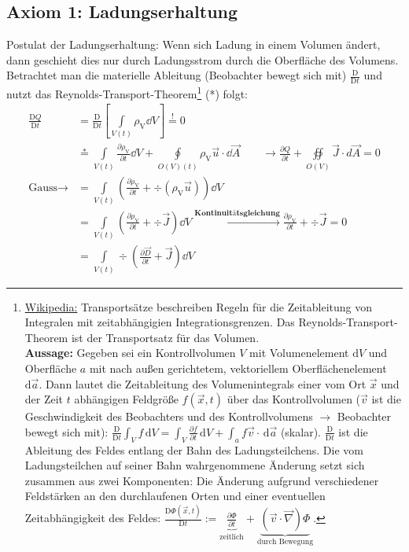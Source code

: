  \subsection{Axiom 1: Ladungserhaltung}\label{ladungserhaltung}
 Postulat der Ladungserhaltung: Wenn sich Ladung in einem Volumen ändert, dann geschieht dies nur durch Ladungsstrom durch die Oberfläche des Volumens.
 Betrachtet man die materielle Ableitung (Beobachter bewegt sich mit) $\frac{\mathrm{D}}{\mathrm{D}t}$ und nutzt das Reynolds-Transport-Theorem\footnote{\href{https://de.wikipedia.org/wiki/Transportsatz}{Wikipedia:} Transportsätze beschreiben Regeln für die Zeitableitung von Integralen mit zeitabhängigien Integrationsgrenzen. Das Reynolds-Transport-Theorem ist der Transportsatz für das Volumen.\\\textbf{Aussage:} Gegeben sei ein Kontrollvolumen $V$ mit Volumenelement $\mathrm{d}V$ und Oberfläche $a$ mit nach außen gerichtetem, vektoriellem Oberflächenelement $\mathrm{d}\vec{a}$. Dann lautet die Zeitableitung des Volumenintegrals einer vom Ort $\vec x$ und der Zeit $t$ abhängigen Feldgröße $f(\vec{x},t)$ über das Kontrollvolumen ($\vec{v}$ ist die Geschwindigkeit des Beobachters und des Kontrollvolumens $\to$ Beobachter bewegt sich mit): $\frac{\mathrm{D}}{\mathrm{D}t}\int_V f\,\mathrm{d}V	=\int_V\frac{\partial f}{\partial t}\,\mathrm{d}V
 	+\int_a f\vec{v}\cdot\,\mathrm{d}\vec{a}
 	$ (skalar). $\frac{\mathrm{D}}{\mathrm{D}t}$ ist die Ableitung des Feldes entlang der Bahn des Ladungsteilchens. Die vom Ladungsteilchen auf seiner Bahn wahrgenommene Änderung setzt sich zusammen aus zwei Komponenten: Die Änderung aufgrund verschiedener Feldstärken an den durchlaufenen Orten und einer eventuellen Zeitabhängigkeit des Feldes: $\frac{\text{D}\Phi(\vec{x},t)}{\text{D}t}:=\underbrace{\frac{\partial\Phi}{\partial t}}_\text{zeitlich}+\underbrace{(\vec{v}\cdot\vec{\nabla})\Phi}_\text{durch Bewegung}$.} (*) folgt:
	        \begin{equation}
		        \begin{split}
			        \frac{\mathrm{D} Q}{\mathrm{D} t}&= \frac{\mathrm{D}}{\mathrm{D} t}\left
			        [ \int\limits_{V(t)}\rho_{\text{V}}\dd V \right] \stackrel{!}{=}0\\&\stackrel{*}{=}
			        \int\limits_{V(t)}\frac{\partial \rho_{\text{V}}}{\partial t}\dd V + \oint
			        \limits_{O(V)(t)}\rho_{\text{V}}\vec{u}\cdot \dd\vec{A}\qquad \to \frac{\partial
				        Q}{\partial t}+ \oiint\limits_{O(V)}\vec{J}\cdot d\vec{A}= 0\\\text{Gauss}\to &\stackrel{}{=}
			        \int\limits_{V(t)}\left(\frac{\partial \rho_{\text{V}}}{\partial t}+ \div
			        \left(\rho_{\text{V}}\vec{u}\right) \right) \dd V \\&= \int\limits_{V(t)}
			        \left(\frac{\partial \rho_{\text{V}}}{\partial t}+ \div \vec{J}\right)
			        \dd V \xrightarrow{\textbf{Kontinuitätsgleichung}}\boxed{\frac{\partial \rho_{\text{V}}}{\partial
				        t}+ \div \vec{J}= 0} \\&= \int\limits_{V(t)}\div \left( \frac{\partial
				        \vec{D}}{\partial t}+ \vec{J}\right) \dd V
		        \end{split}
	        \end{equation}

